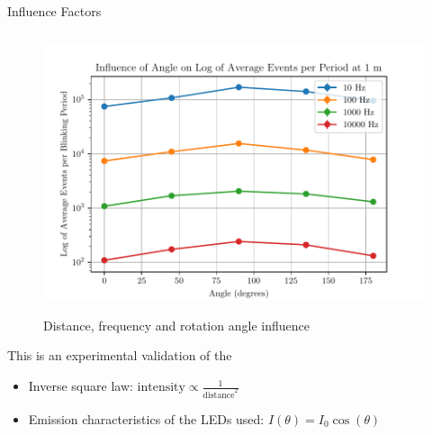 \documentclass{beamer}
\begin{document}
\begin{frame}{Influence Factors}
\begin{columns}[T]
    \begin{column}{0.48\textwidth}
        \vspace{-0.3cm}
        \begin{figure}[H]
            \centering
            \includegraphics[width=\textwidth]{../fig/semestral/angle2.pdf}
            \label{fig:rotation_influence}
            \caption{Distance, frequency and rotation angle influence}
        \end{figure}
        
        \tiny{
            This is an experimental validation of the
            \begin{itemize}
                \item Inverse square law: $\text{intensity} \propto \frac{1}{\text{distance}^2}$
                \item Emission characteristics of the LEDs used: $I(\theta) = I_0\cos(\theta)$
            \end{itemize}
        }
    \end{column}
\end{columns}

\end{frame}

\end{document}
